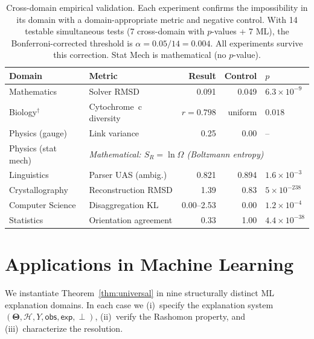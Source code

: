 \documentclass[11pt,a4paper]{article}
\newcommand{\Params}{\mathbf{\Theta}}
\newcommand{\sH}{\mathcal{H}}
\newcommand{\incomp}{\perp}
\begin{document}
\begin{table}[t]
\centering
\caption{Cross-domain empirical validation.  Each experiment confirms the impossibility in its domain with a domain-appropriate metric and negative control.  With 14 testable simultaneous tests (7 cross-domain with $p$-values + 7 ML), the Bonferroni-corrected threshold is $\alpha = 0.05/14 = 0.004$.  All experiments survive this correction.  Stat Mech is mathematical (no $p$-value).}
\label{tab:cross-domain}
\begin{tabular}{llrrl}
\toprule
Domain & Metric & Result & Control & $p$ \\
\midrule
Mathematics & Solver RMSD & 0.091 & 0.049 & $6.3{\times}10^{-9}$ \\
Biology$^\dagger$ & Cytochrome~c diversity & $r = 0.798$ & uniform & $0.018$ \\
Physics (gauge) & Link variance & 0.25 & 0.00 & -- \\
Physics (stat mech) & \multicolumn{4}{l}{\textit{Mathematical: $S_R = \ln\Omega$ (Boltzmann entropy)}} \\
Linguistics & Parser UAS (ambig.) & 0.821 & 0.894 & $1.6{\times}10^{-3}$ \\
Crystallography & Reconstruction RMSD & 1.39 & 0.83 & $5{\times}10^{-238}$ \\
Computer Science & Disaggregation KL & 0.00--2.53 & 0.00 & $1.2{\times}10^{-4}$ \\
Statistics & Orientation agreement & 0.33 & 1.00 & $4.4{\times}10^{-38}$ \\
\bottomrule
\end{tabular}

\smallskip
{}
\end{table}

\section{Applications in Machine Learning}
\label{sec:ml-instances}

We instantiate Theorem~\ref{thm:universal} in nine structurally distinct
ML explanation domains.  In each case we (i)~specify the explanation system
$(\Params, \sH, Y, \mathsf{obs}, \mathsf{exp}, \incomp)$, (ii)~verify the
Rashomon property, and (iii)~characterize the resolution.
\end{document}
